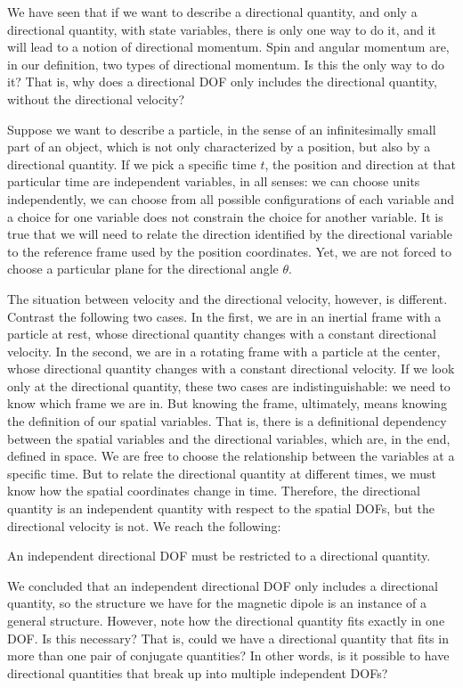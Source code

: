 We have seen that if we want to describe a directional quantity, and only a directional quantity, with state variables, there is only one way to do it, and it will lead to a notion of directional momentum. Spin and angular momentum are, in our definition, two types of directional momentum. Is this the only way to do it? That is, why does a directional DOF only includes the directional quantity, without the directional velocity?

Suppose we want to describe a particle, in the sense of an infinitesimally small part of an object, which is not only characterized by a position, but also by a directional quantity. If we pick a specific time $t$, the position and direction at that particular time are independent variables, in all senses: we can choose units independently, we can choose from all possible configurations of each variable and a choice for one variable does not constrain the choice for another variable. It is true that we will need to relate the direction identified by the directional variable to the reference frame used by the position coordinates. Yet, we are not forced to choose a particular plane for the directional angle $\theta$.

The situation between velocity and the directional velocity, however, is different. Contrast the following two cases. In the first, we are in an inertial frame with a particle at rest, whose directional quantity changes with a constant directional velocity. In the second, we are in a rotating frame with a particle at the center, whose directional quantity changes with a constant directional velocity. If we look only at the directional quantity, these two cases are indistinguishable: we need to know which frame we are in. But knowing the frame, ultimately, means knowing the definition of our spatial variables. That is, there is a definitional dependency between the spatial variables and the directional variables, which are, in the end, defined in space. We are free to choose the relationship between the variables at a specific time. But to relate the directional quantity at different times, we must know how the spatial coordinates change in time. Therefore, the directional quantity is an independent quantity with respect to the spatial DOFs, but the directional velocity is not. We reach the following:
\begin{insight}
	An independent directional DOF must be restricted to a directional quantity.
\end{insight}

We concluded that an independent directional DOF only includes a directional quantity, so the structure we have for the magnetic dipole is an instance of a general structure. However, note how the directional quantity fits exactly in one DOF. Is this necessary? That is, could we have a directional quantity that fits in more than one pair of conjugate quantities? In other words, is it possible to have directional quantities that break up into multiple independent DOFs?

